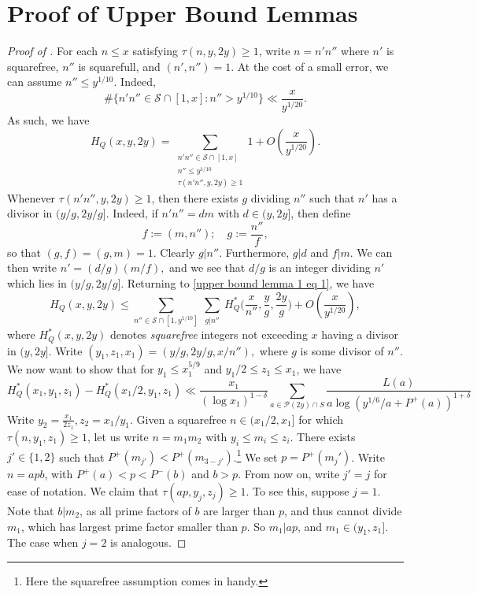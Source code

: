 \documentclass{amsart}
\theoremstyle{definition}
\numberwithin{equation}{section}
\renewcommand{\S}{\mathcal{S}}
\newcommand{\density}{\delta}
\begin{document}
		\section{Proof of Upper Bound Lemmas}\label{sec upper bound proofs}
	\begin{proof}[Proof of ]
		For each $n \leq x$ satisfying $\tau(n,y,2y) \geq 1$, write $n = n'n''$ where $n'$ is squarefree, $n''$ is squarefull, and $(n',n'') = 1$. At the cost of a small error, we can assume $n'' \leq y^{1/10}.$ Indeed, 
		$$\#\{n'n'' \in \S \cap [1,x] : n'' > y^{1/10} \} \ll \frac{x}{y^{1/20}}.$$
		As such, we have
		\begin{equation}\label{upper bound lemma 1 eq 1}
			H_Q(x,y,2y) = \sum_{\substack{n'n'' \in \S \cap [1,x]\\ n'' \leq y^{1/10}\\ \tau(n'n'',y,2y) \geq 1}}1 +O\left(\frac{x}{y^{1/20}}\right).
		\end{equation}
		Whenever $\tau(n'n'',y,2y) \geq 1$, then there exists $g$ dividing $n''$ such that $n'$ has a divisor in $(y/g,2y/g]$. Indeed, if $n'n'' = dm$ with $d \in (y,2y]$, then define
		$$f := (m,n''); \quad g := \frac{n''}{f},$$
		so that $(g,f) = (g,m) = 1$. Clearly $g|n''$. Furthermore, $g | d$ and $f|m$. We can then write $n' = (d/g)(m/f),$ and we see that $d/g$ is an integer dividing $n'$ which lies in $(y/g,2y/g]$. Returning to \eqref{upper bound lemma 1 eq 1}, we have
		\begin{equation}\label{upper bound lemma 1 eq 2}
			H_Q(x,y,2y) \leq \sum_{n'' \in \S \cap [1, y^{1/10}]}\sum_{\substack{g|n''}}H^*_Q \bigg(\frac{x}{n''},\frac{y}{g},\frac{2y}{g}\bigg) +O\left(\frac{x}{y^{1/20}}\right),
		\end{equation}
		where $H^*_Q(x,y,2y)$ denotes \textit{squarefree} integers not exceeding $x$ having a divisor in $(y,2y]$. Write $(y_1,z_1,x_1) = (y/g,2y/g,x/n''),$ where $g$ is some divisor of $n''$. We now want to show that for $y_1 \leq x_1 ^{5/9}$ and $y_1/2 \leq z_1 \leq x_1$, we have 
		\begin{equation}\label{upper bound lemma 1 eq 3}
			H^*_Q(x_1,y_1,z_1) - H^*_Q(x_1/2,y_1,z_1) \ll \frac{x_1}{(\log x_1)^{1-\density}} \sum_{a \in \mathscr{P}(2y) \cap S}\frac{L(a)}{a\log(y^{1/6}/a + P^+(a))^{1+\density}} 
		\end{equation}
		Write $y_2 = \frac{x_1}{2z_1}, z_2 = x_1/y_1$. Given a squarefree $n \in (x_1/2,x_1]$ for which $\tau(n,y_1,z_1)\geq 1$, let us write $n = m_1m_2$ with $y_i \leq m_i \leq z_i$. There exists $j' \in \{1,2\}$ such that $P^+(m_{j'})<P^+(m_{3-j'})$.\footnote{Here the squarefree assumption comes in handy.} We set $p = P^+(m_j')$. Write $n = apb$, with $P^+(a) < p < P^-(b)$ and $b > p$. From now on, write $j' = j$ for ease of notation. We claim that $\tau(ap,y_{j},z_j) \geq 1.$ To see this, suppose $j = 1$. Note that $b|m_2$, as all prime factors of $b$ are larger than $p$, and thus cannot divide $m_1$, which has largest prime factor smaller than $p$. So $m_1|ap$, and $m_1 \in (y_1,z_1]$. The case when $j=2$ is analogous. 
		

\end{proof}
\end{document}
